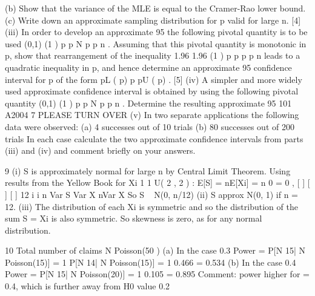 \documentclass[a4paper,12pt]{article}
\begin{document}
\begin{enumerate}
(b) Show that the variance of the MLE is equal to the Cramer-Rao lower
bound.
(c) Write down an approximate sampling distribution for p valid for
large n.
[4]
(iii) In order to develop an approximate 95%
the following pivotal quantity is to be used
(0,1)
(1 )
p p
N
p p
n
.
Assuming that this pivotal quantity is monotonic in p, show that rearrangement
of the inequality
1.96 1.96
(1 )
p p
p p
n
leads to a quadratic inequality in p, and hence determine an approximate 95%
confidence interval for p of the form pL ( p) p pU ( p) .
[5]
(iv) A simpler and more widely used approximate confidence interval is obtained
by using the following pivotal quantity
(0,1)
(1 )
p p
N
p p
n
.
Determine the resulting approximate 95%
101 A2004 7 PLEASE TURN OVER
(v) In two separate applications the following data were observed:
(a) 4 successes out of 10 trials
(b) 80 successes out of 200 trials
In each case calculate the two approximate confidence intervals from parts
(iii) and (iv) and comment briefly on your answers.
\end{enumerate}
\newpage
9 (i) S is approximately normal for large n by Central Limit Theorem.
Using results from the Yellow Book for Xi
1 1
U( 2 , 2 ) :
E[S] = nE[Xi] = n 0 = 0 , [ ] [ ] [ ]
12 i i
n
Var S Var X nVar X
So S ~ N(0, n/12)
(ii) S approx N(0, 1) if n = 12.
(iii) The distribution of each Xi is symmetric and so the distribution of the sum
S = Xi is also symmetric. So skewness is zero, as for any normal distribution.

10 Total number of claims N Poisson(50 )
(a) In the case 0.3
Power = P[N 15| N Poisson(15)]
= 1 P[N 14| N Poisson(15)] = 1 0.466 = 0.534
(b) In the case 0.4
Power = P[N 15| N Poisson(20)] = 1 0.105 = 0.895
Comment: power higher for = 0.4, which is further away from H0 value 0.2
\end{document}

